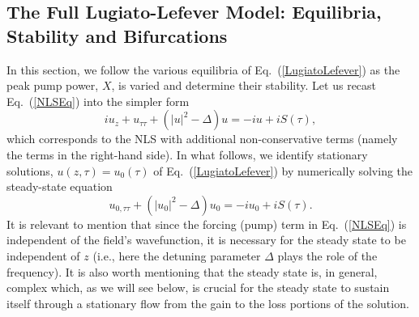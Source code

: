 \subsection{The Full Lugiato-Lefever Model: Equilibria, Stability and Bifurcations
\label{secModel}}
%
In this section, we follow the various equilibria of Eq.~(\ref{LugiatoLefever}) as the 
peak pump power, $X$, is varied and determine their stability.  
%
Let us recast Eq.~(\ref{NLSEq}) into the simpler form
%
\begin{equation}
 i u_z + u_{\tau \tau} + (|u|^2 - \Delta) u = - i u  + i S(\tau),
 \label{LugiatoLefever}
\end{equation}
%
which corresponds to the NLS with additional non-conservative terms
(namely the terms in the right-hand side).
%
In what follows, we identify stationary solutions, $u(z,\tau)=u_0(\tau)$
of Eq.~(\ref{LugiatoLefever}) by numerically solving the steady-state equation
%
\begin{equation}
 u_{0,\tau \tau} + (|u_0|^2 - \Delta) u_0 = - iu_0  + i S(\tau).
\label{u0}
\end{equation}
% 
It is relevant to mention that since the forcing 
(pump) term in Eq.~(\ref{NLSEq}) is independent
of the field's wavefunction, it is necessary for the steady state to 
be independent of $z$ (i.e., here the detuning parameter $\Delta$ 
plays the role of the frequency). It is also 
worth mentioning that the steady state
is, in general, complex which, as we will see below, is crucial for the steady
state to sustain itself through a stationary flow from the gain to the loss
portions of the solution.  

